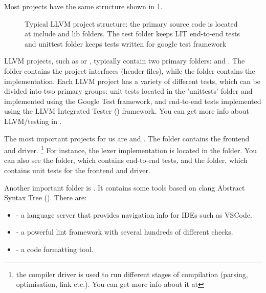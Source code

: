 Most projects have the same structure shown in
\cref{fig:typical_llvm_project}.
\begin{figure}[H]
  \begin{center}
  \end{center}
  \caption{Typical LLVM project structure: the primary source code is located at
    include and lib folders. The test folder keeps LIT end-to-end tests and
    unittest folder keeps tests written for google test framework}
  \label{fig:typical_llvm_project}
\end{figure}
LLVM projects, such as  or , typically contain two
primary folders: 
 and . The
 folder contains the project interfaces (header
files), while the  folder contains the
implementation. Each LLVM project has a variety of different tests, which can be
divided into two primary groups: unit tests located in the 'unittests' folder
and implemented using the Google Test framework, and end-to-end tests
implemented using the LLVM Integrated Tester () framework.
You can get more info about LLVM/\clang testing in .

The most important projects for us are  and . The
 folder contains the frontend and driver.
\footnote{the compiler driver is used to run different stages of compilation
(parsing, optimisation, link etc.). You can get more info about it at }
For instance,
the lexer implementation is located in the 
folder. You can also see the  folder, which
contains end-to-end tests, and the  folder,
which contains unit tests for the frontend and driver. 

Another important folder is . It contains
some tools based on clang Abstract Syntax Tree (\myast). There are: 
\begin{itemize}
\item {} - a language server that
  provides navigation info for IDEs such as VSCode. 
\item {} - a powerful lint
  framework with several hundreds of different checks. 
\item {} - a code formatting tool.
\end{itemize}

